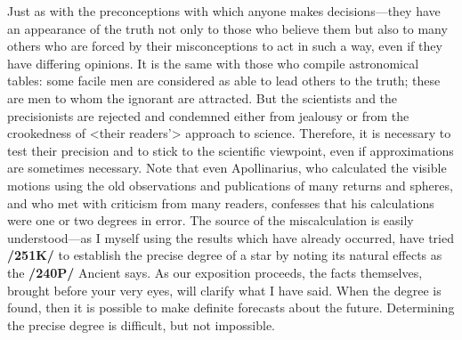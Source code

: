 Just as with the preconceptions with which anyone makes decisions—they have an appearance of the truth not only to those who believe them but also to many others who are forced by their misconceptions
to act in such a way, even if they have differing opinions. It is the same with those who compile astronomical tables: some facile men are considered as able to lead others to the truth; these are men to
whom the ignorant are attracted. But the scientists and the precisionists are rejected and condemned either from jealousy or from the crookedness of <their readers’> approach to science. Therefore, it is necessary to test their precision and to stick to the scientific viewpoint, even if approximations are sometimes necessary. Note that even Apollinarius, who calculated the visible motions using the old observations and publications of many returns and spheres, and who met with criticism from many readers, confesses that his calculations were one or two degrees in error. The source of the miscalculation is easily understood—as I myself using the results which have already occurred, have tried \textbf{/251K/} to establish the precise degree of a star by noting its natural effects as the \textbf{/240P/} Ancient says. As our exposition proceeds, the facts themselves, brought before your very eyes, will clarify what I have said. When the degree is found, then it is possible to make definite forecasts about the future. Determining the precise degree is difficult, but not impossible.

\newpage